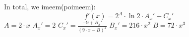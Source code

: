 \documentclass[a4paper, 12pt]{article}
\begin{document}
In total, we imeem(poimeem): \newline\[f'(x) = {{{{{2} ^ {A}} \cdot  \ln {{2}} } \cdot {A_x'}} + {C_x'}}\]
\newline
$A = {{2} \cdot {x}}$
\newline\newline
$A_x' = {2}$
\newline\newline
$C_x' =  \frac {{{-9} + {B_x'}}} {{\left({{{9} \cdot {x}} - {B}}\right) ^ {2}}}$
\newline\newline
$B_x' = {{216} \cdot {{x} ^ {2}}}$
\newline\newline
$B = {{72} \cdot {{x} ^ {3}}}$
\newline\newline
\newline
\end{document}
